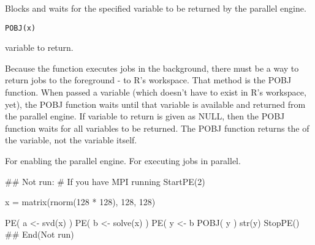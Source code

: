 \begin{Description}\relax
Blocks and waits for the specified variable to be returned by the
parallel engine.
\end{Description}
\begin{Usage}
\begin{verbatim}
POBJ(x)
\end{verbatim}
\end{Usage}
\begin{Arguments}
\begin{ldescription}
\item[\code{x}] variable to return. 
\end{ldescription}
\end{Arguments}
\begin{Details}\relax
Because the  function executes jobs in the background,
there must be a way to return jobs to the foreground - to R's workspace.
That method is the POBJ function.  When passed a variable (which doesn't
have to exist in R's workspace, yet), the POBJ function waits until that
variable is available and returned from the parallel engine.
If variable to return is given as NULL, then the POBJ function waits for
all variables to be returned.
The POBJ function returns the  of the variable, not the
variable itself.
\end{Details}
\begin{SeeAlso}\relax
{}  For enabling the parallel engine.
  For executing jobs in parallel.
\end{SeeAlso}
\begin{Examples}
\begin{ExampleCode}
## Not run: 
# If you have MPI running
StartPE(2)

x = matrix(rnorm(128 * 128), 128, 128)

PE( a <- svd(x) )
PE( b <- solve(x) )
PE( y <- b %
POBJ( y )
str(y)
StopPE()
## End(Not run)
\end{ExampleCode}
\end{Examples}

